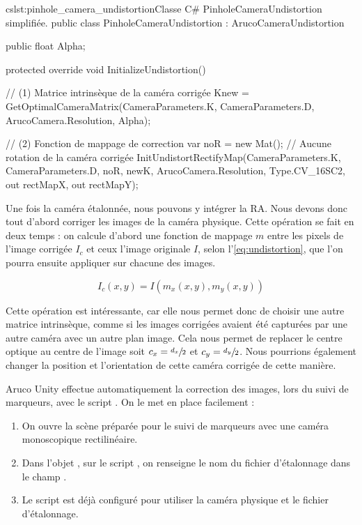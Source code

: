 \begin{listingETS}{cs}{lst:pinhole_camera_undistortion}{Classe C\# PinholeCameraUndistortion simplifiée.}
  public class PinholeCameraUndistortion : ArucoCameraUndistortion
  {
    public float Alpha;

    protected override void InitializeUndistortion()
    {
      // (1) Matrice intrinsèque de la caméra corrigée
      Knew = GetOptimalCameraMatrix(CameraParameters.K, CameraParameters.D, ArucoCamera.Resolution, Alpha);

      // (2) Fonction de mappage de correction
      var noR = new Mat(); // Aucune rotation de la caméra corrigée
      InitUndistortRectifyMap(CameraParameters.K, CameraParameters.D, noR, newK, ArucoCamera.Resolution, Type.CV_16SC2, out rectMapX, out rectMapY);
    }
  }
\end{listingETS}

Une fois la caméra étalonnée, nous pouvons y intégrer la RA. Nous devons donc tout d'abord corriger les images de la caméra physique. Cette opération se fait en deux temps : on calcule d'abord une fonction de mappage $m$ entre les pixels de l'image corrigée $I_c$ et ceux l'image originale $I$, selon l'\autoref{eq:undistortion}, que l'on pourra ensuite appliquer sur chacune des images.

\begin{equation}
  \label{eq:undistortion}
  I_c(x,y) = I(m_x(x,y), m_y(x,y))
\end{equation}

Cette opération est intéressante, car elle nous permet donc de choisir une autre matrice intrinsèque, comme si les images corrigées avaient été capturées par une autre caméra avec un autre plan image. Cela nous permet de replacer le centre optique au centre de l'image soit $c_x = \sfrac{d_x}{2}$ et $c_y = \sfrac{d_y}{2}$. Nous pourrions également changer la position et l'orientation de cette caméra corrigée de cette manière.

Aruco Unity effectue automatiquement la correction des images, lors du suivi de marqueurs, avec le script . On le met en place facilement  :
\begin{enumerate}
  \item On ouvre la scène  préparée pour le suivi de marqueurs avec une caméra monoscopique rectilinéaire.
  \item Dans l'objet , sur le script , on renseigne le nom du fichier d'étalonnage dans le champ .
  \item Le script  est déjà configuré pour utiliser la caméra physique et le fichier d'étalonnage.
\end{enumerate}
\bigskip

